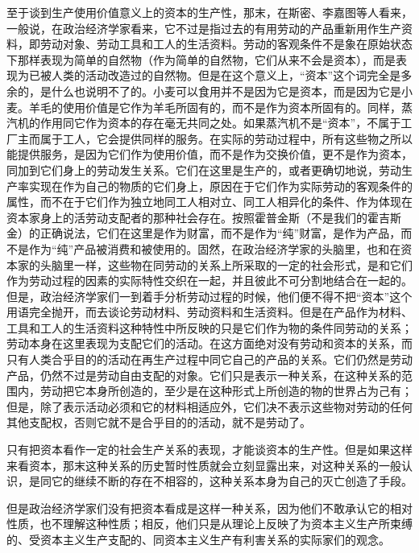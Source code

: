 至于谈到生产使用价值意义上的资本的生产性，那末，在斯密、李嘉图等人看来，一般说，在政治经济学家看来，它不过是指过去的有用劳动的产品重新用作生产资料，即劳动对象、劳动工具和工人的生活资料。劳动的客观条件不是象在原始状态下那样表现为简单的自然物（作为简单的自然物，它们从来不会是资本），而是表现为已被人类的活动改造过的自然物。但是在这个意义上，“资本”这个词完全是多余的，是什么也说明不了的。小麦可以食用并不是因为它是资本，而是因为它是小麦。羊毛的使用价值是它作为羊毛所固有的，而不是作为资本所固有的。同样，蒸汽机的作用同它作为资本的存在毫无共同之处。如果蒸汽机不是“资本”，不属于工厂主而属于工人，它会提供同样的服务。在实际的劳动过程中，所有这些物之所以能提供服务，是因为它们作为使用价值，而不是作为交换价值，更不是作为资本，同加到它们身上的劳动发生关系。它们在这里是生产的，或者更确切地说，劳动生产率实现在作为自己的物质的它们身上，原因在于它们作为实际劳动的客观条件的属性，而不在于它们作为独立地同工人相对立、同工人相异化的条件、作为体现在资本家身上的活劳动支配者的那种社会存在。按照霍普金斯（不是我们的霍吉斯金）的正确说法，它们在这里是作为财富，而不是作为“纯”财富，是作为产品，而不是作为“纯”产品被消费和被使用的。固然，在政治经济学家的头脑里，也和在资本家的头脑里一样，这些物在同劳动的关系上所采取的一定的社会形式，是和它们作为劳动过程的因素的实际特性交织在一起，并且彼此不可分割地结合在一起的。但是，政治经济学家们一到着手分析劳动过程的时候，他们便不得不把“资本”这个用语完全抛开，而去谈论劳动材料、劳动资料和生活资料。但是在产品作为材料、工具和工人的生活资料这种特性中所反映的只是它们作为物的条件同劳动的关系；劳动本身在这里表现为支配它们的活动。在这方面绝对没有劳动和资本的关系，而只有人类合乎目的的活动在再生产过程中同它自己的产品的关系。它们仍然是劳动产品，仍然不过是劳动自由支配的对象。它们只是表示一种关系，在这种关系的范围内，劳动把它本身所创造的，至少是在这种形式上所创造的物的世界占为己有；但是，除了表示活动必须和它的材料相适应外，它们决不表示这些物对劳动的任何其他支配权，否则它就不是合乎目的的活动，就不是劳动了。

只有把资本看作一定的社会生产关系的表现，才能谈资本的生产性。但是如果这样来看资本，那末这种关系的历史暂时性质就会立刻显露出来，对这种关系的一般认识，是同它的继续不断的存在不相容的，这种关系本身为自己的灭亡创造了手段。

但是政治经济学家们没有把资本看成是这样一种关系，因为他们不敢承认它的相对性质，也不理解这种性质；相反，他们只是从理论上反映了为资本主义生产所束缚的、受资本主义生产支配的、同资本主义生产有利害关系的实际家们的观念。

